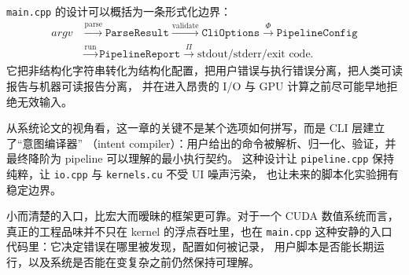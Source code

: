 \texttt{main.cpp} 的设计可以概括为一条形式化边界：
\[
\begin{aligned}
    argv
    &\xrightarrow{\text{parse}}
    \texttt{ParseResult}
    \xrightarrow{\text{validate}}
    \texttt{CliOptions}
    \xrightarrow{\Phi}
    \texttt{PipelineConfig} \\
    &\xrightarrow{\text{run}}
    \texttt{PipelineReport}
    \xrightarrow{\Pi}
    \text{stdout/stderr/exit code}.
\end{aligned}
\]
它把非结构化字符串转化为结构化配置，把用户错误与执行错误分离，把人类可读报告与机器可读报告分离，
并在进入昂贵的 I/O 与 GPU 计算之前尽可能早地拒绝无效输入。

从系统论文的视角看，这一章的关键不是某个选项如何拼写，而是 CLI 层建立了“意图编译器”
（intent compiler）：用户给出的命令被解析、归一化、验证，并最终降阶为 pipeline 可以理解的最小执行契约。
这种设计让 \texttt{pipeline.cpp} 保持纯粹，让 \texttt{io.cpp} 与 \texttt{kernels.cu} 不受 UI 噪声污染，
也让未来的脚本化实验拥有稳定边界。

小而清楚的入口，比宏大而暧昧的框架更可靠。对于一个 CUDA 数值系统而言，真正的工程品味并不只在 kernel
的浮点吞吐里，也在 \texttt{main.cpp} 这种安静的入口代码里：它决定错误在哪里被发现，配置如何被记录，
用户脚本是否能长期运行，以及系统是否能在变复杂之前仍然保持可理解。
